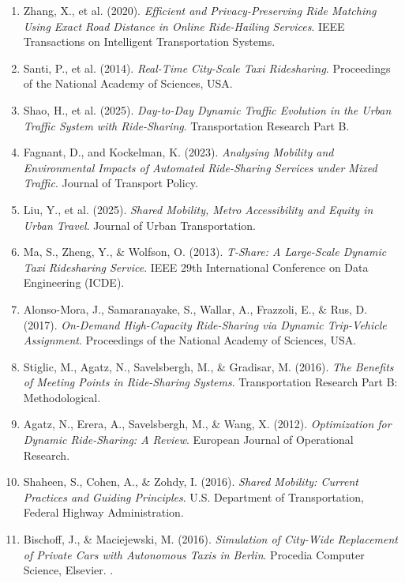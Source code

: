 \documentclass[10pt,a4paper]{report}
\begin{document}
\begin{enumerate}
    \item Zhang, X., et al. (2020). \textit{Efficient and Privacy-Preserving Ride Matching Using Exact Road Distance in Online Ride-Hailing Services}. IEEE Transactions on Intelligent Transportation Systems.

    \item Santi, P., et al. (2014). \textit{Real-Time City-Scale Taxi Ridesharing}. Proceedings of the National Academy of Sciences, USA.

    \item Shao, H., et al. (2025). \textit{Day-to-Day Dynamic Traffic Evolution in the Urban Traffic System with Ride-Sharing}. Transportation Research Part B.

    \item Fagnant, D., and Kockelman, K. (2023). \textit{Analysing Mobility and Environmental Impacts of Automated Ride-Sharing Services under Mixed Traffic}. Journal of Transport Policy.

    \item Liu, Y., et al. (2025). \textit{Shared Mobility, Metro Accessibility and Equity in Urban Travel}. Journal of Urban Transportation.

    \item Ma, S., Zheng, Y., \& Wolfson, O. (2013). \textit{T-Share: A Large-Scale Dynamic Taxi Ridesharing Service}. IEEE 29th International Conference on Data Engineering (ICDE).

    \item Alonso-Mora, J., Samaranayake, S., Wallar, A., Frazzoli, E., \& Rus, D. (2017). \textit{On-Demand High-Capacity Ride-Sharing via Dynamic Trip-Vehicle Assignment}. Proceedings of the National Academy of Sciences, USA.

    \item Stiglic, M., Agatz, N., Savelsbergh, M., \& Gradisar, M. (2016). \textit{The Benefits of Meeting Points in Ride-Sharing Systems}. Transportation Research Part B: Methodological.

    \item Agatz, N., Erera, A., Savelsbergh, M., \& Wang, X. (2012). \textit{Optimization for Dynamic Ride-Sharing: A Review}. European Journal of Operational Research.

    \item Shaheen, S., Cohen, A., \& Zohdy, I. (2016). \textit{Shared Mobility: Current Practices and Guiding Principles}. U.S. Department of Transportation, Federal Highway Administration.

    \item Bischoff, J., \& Maciejewski, M. (2016). \textit{Simulation of City-Wide Replacement of Private Cars with Autonomous Taxis in Berlin}. Procedia Computer Science, Elsevier.
.
\end{enumerate}
\end{document}
